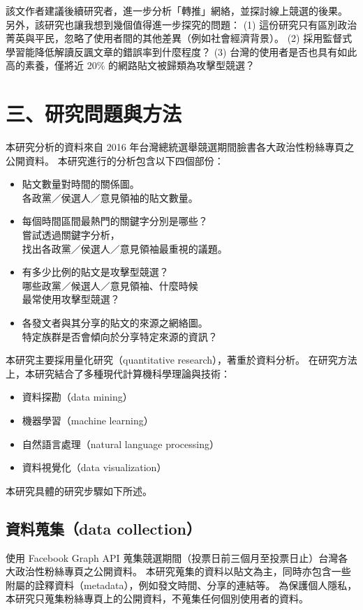 \documentclass[letterpaper, 10pt, conference]{ieeeconf}   %
\begin{document}
\begin{CJK}{UTF8}{bsmi}
該文作者建議後續研究者，進一步分析「轉推」網絡，並探討線上競選的後果。
另外，該研究也讓我想到幾個值得進一步探究的問題：
 (1) 這份研究只有區別政治菁英與平民，忽略了使用者間的其他差異（例如社會經濟背景）。
 (2) 採用監督式學習能降低解讀反諷文章的錯誤率到什麼程度？
 (3) 台灣的使用者是否也具有如此高的素養，僅將近 20\% 的網路貼文被歸類為攻擊型競選？

\section*{三、研究問題與方法}

本研究分析的資料來自 2016 年台灣總統選舉競選期間臉書各大政治性粉絲專頁之公開資料。
本研究進行的分析包含以下四個部份：
\begin{itemize}
\item 貼文數量對時間的關係圖。\\
各政黨／侯選人／意見領袖的貼文數量。
\item 每個時間區間最熱門的關鍵字分別是哪些？\\
嘗試透過關鍵字分析，\\
找出各政黨／侯選人／意見領袖最重視的議題。
\item 有多少比例的貼文是攻擊型競選？\\
哪些政黨／候選人／意見領袖、什麼時候\\
最常使用攻擊型競選？
\item 各發文者與其分享的貼文的來源之網絡圖。\\
特定族群是否會傾向於分享特定來源的資訊？
\end{itemize}

本研究主要採用量化研究（quantitative research），著重於資料分析。
在研究方法上，本研究結合了多種現代計算機科學理論與技術：
\begin{itemize}
\item 資料探勘（data mining）
\item 機器學習（machine learning）
\item 自然語言處理（natural language processing）
\item 資料視覺化（data visualization）
\end{itemize}

本研究具體的研究步驟如下所述。

\subsection*{資料蒐集（data collection）}

使用 Facebook Graph API 蒐集競選期間（投票日前三個月至投票日止）台灣各大政治性粉絲專頁之公開資料。
本研究蒐集的資料以貼文為主，同時亦包含一些附屬的詮釋資料（metadata），例如發文時間、分享的連結等。
為保護個人隱私，本研究只蒐集粉絲專頁上的公開資料，不蒐集任何個別使用者的資料。


\end{CJK}
\end{document}
